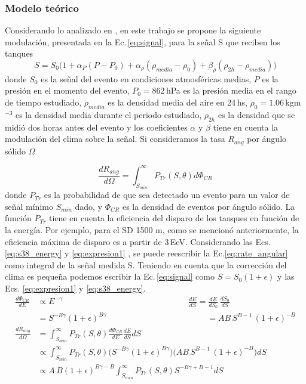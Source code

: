 \subsubsection{Modelo teórico}

Considerando lo analizado en \cite{aab2017impact} \cite{collaboration2009atmospheric}, en este trabajo se propone la siguiente modulación, presentada en la Ec.\,\ref{eq:signal}, para la señal S que reciben los tanques 
\begin{equation}
	S=S_0\big(1+\alpha_P(P-P_0) +\alpha_{\rho}(\rho_{media}-\rho_0) + \beta_{\rho}(\rho_{2h}-\rho_{media})\big)
	\label{eq:signal}
\end{equation}
donde $S_0$ es la señal  del evento en condiciones atmosféricas medias, $P$ es la presión en el momento del evento, $P_0=862\,$hPa es la presión media en el rango de tiempo estudiado, $\rho_{media}$ es la densidad  media del aire en 24\,hs, $\rho_0=1.06\,$kgm$^{-3}$ es la densidad media durante el periodo estudiado, $\rho_{2h}$ es la densidad que se midió dos horas antes del evento  y los coeficientes $\alpha$ y $\beta$ tiene en cuenta la modulación del clima sobre la señal.  Si consideramos la tasa $R_{ang}$  por ángulo sólido $\Omega$

\begin{equation}
	\frac{dR_{ang}}{d\Omega} = \int_{S_{min}}^{\infty} P_{Tr}(S,\theta) d\Phi_{CR}
	\label{eq:rate_angular}
\end{equation}
donde $P_{Tr}$ es la probabilidad de que sea detectado un evento para un valor de señal mínimo $S_{min}$ dado, y $\Phi_{CR}$ es la densidad de eventos por ángulo sólido. La función $P_{Tr}$ tiene en cuenta la eficiencia del disparo de los tanques en función de la energía. Por ejemplo, para el SD 1500 m, como se mencionó anteriormente, la eficiencia máxima de disparo es a partir  de $3\,$EeV. Considerando  las Ecs.\,\ref{eq:s38_energy} y \ref{eq:expresion1} , se puede reescribir la Ec.\ref{eq:rate_angular} como integral de la señal medida S. Teniendo en cuenta que la corrección del clima es pequeña podemos escribir la Ec.\,\ref{eq:signal} como $S=S_0(1+\epsilon)$ y las Ecs. \ref{eq:expresion1} y \ref{eq:s38_energy}.
\begin{align*}
\frac{d\Phi_{CR}}{dE} 	&\propto E^{-\gamma} 					\qquad\qquad\qquad\qquad\qquad \quad \qquad \qquad		\frac{dE}{dS}  			= \frac{dE}{dS_0}\,\frac{dS_0}{dS}\\ 
					  	&= S^{-B\gamma}(1+\epsilon)^{B\gamma}    \qquad\qquad \qquad\qquad\qquad \qquad 				  	 = AB\,S^{B-1}\, (1+\epsilon)^{-B}\\
   		    			\frac{dR_{ang}}{d\Omega} &= \int_{S_{min}}^{\infty} P_{Tr}(S,\theta) \frac{d\Phi_{CR}}{dE} \frac{dE}{dS} dS\\
    						 &\propto \int_{S_{min}}^{\infty} P_{Tr}(S,\theta) \bigg( S^{-B\gamma}(1+\epsilon)^{B\gamma}\bigg) \bigg( AB\,S^{B-1}\, (1+\epsilon)^{-B}\bigg)dS\\
    						 &\propto A\,B (1+\epsilon)^{B\gamma - B}\int_{S_{min}}^{\infty} P_{Tr}(S,\theta) S^{-B\gamma +B -1} dS\\
\end{align*}

